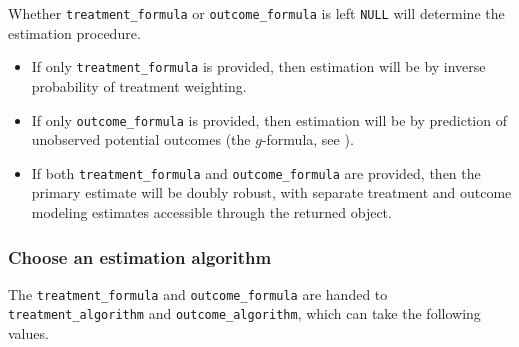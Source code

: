 \documentclass[
]{article}
\providecommand{\tightlist}{%
  \setlength{\itemsep}{0pt}\setlength{\parskip}{0pt}}
\begin{document}
Whether \texttt{treatment\_formula} or \texttt{outcome\_formula} is left \texttt{NULL} will determine the estimation procedure.

\begin{itemize}
\tightlist
\item
  If only \texttt{treatment\_formula} is provided, then estimation will be by inverse probability of treatment weighting.
\item
  If only \texttt{outcome\_formula} is provided, then estimation will be by prediction of unobserved potential outcomes (the \(g\)-formula, see \citet{hernan2021}).
\item
  If both \texttt{treatment\_formula} and \texttt{outcome\_formula} are provided, then the primary estimate will be doubly robust, with separate treatment and outcome modeling estimates accessible through the returned object.
\end{itemize}

\hypertarget{choose-an-estimation-algorithm}{%
\subsubsection{Choose an estimation algorithm}\label{choose-an-estimation-algorithm}}

The \texttt{treatment\_formula} and \texttt{outcome\_formula} are handed to \texttt{treatment\_algorithm} and \texttt{outcome\_algorithm}, which can take the following values.
\end{document}

